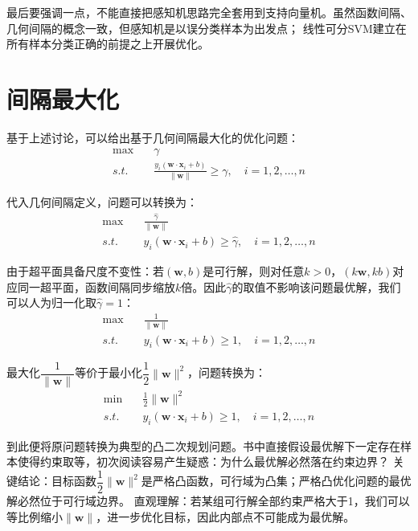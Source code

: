 \documentclass{article}
\begin{document}
        最后要强调一点，不能直接把感知机思路完全套用到支持向量机。虽然函数间隔、几何间隔的概念一致，但感知机是以误分类样本为出发点；
        线性可分SVM建立在所有样本分类正确的前提之上开展优化。

    \section{间隔最大化}
        基于上述讨论，可以给出基于几何间隔最大化的优化问题：
        \begin{align*}
            \max \quad & \gamma \\
            s.t. \quad & \frac{y_i(\boldsymbol{w}\cdot \boldsymbol{x}_i+b)}{\|\boldsymbol{w}\|}\ge \gamma,\quad i=1,2,\dots,n
        \end{align*}

        代入几何间隔定义，问题可以转换为：
        \begin{align*}
            \max \quad & \frac{\widehat{\gamma}}{\|\boldsymbol{w}\|}  \\
            s.t. \quad & y_i(\boldsymbol{w}\cdot \boldsymbol{x}_i+b)\ge \widehat{\gamma},\quad i=1,2,\dots,n
        \end{align*}

        由于超平面具备尺度不变性：若$(\boldsymbol{w},b)$是可行解，则对任意$k>0$，$(k\boldsymbol{w},kb)$对应同一超平面，函数间隔同步缩放$k$倍。因此$\widehat{\gamma}$的取值不影响该问题最优解，我们可以人为归一化取$\widehat{\gamma}=1$：
        \begin{align*}
            \max \quad & \frac{1}{\|\boldsymbol{w}\|}  \\
            s.t. \quad & y_i(\boldsymbol{w}\cdot \boldsymbol{x}_i+b)\ge 1,\quad i=1,2,\dots,n
        \end{align*}

        最大化$\dfrac{1}{\|\boldsymbol{w}\|}$等价于最小化$\dfrac{1}{2}\|\boldsymbol{w}\|^2$，问题转换为：
        \begin{align*}
            \min \quad & \frac{1}{2}\|\boldsymbol{w}\|^2  \\
            s.t. \quad & y_i(\boldsymbol{w}\cdot \boldsymbol{x}_i+b)\ge 1,\quad i=1,2,\dots,n
        \end{align*}

        到此便将原问题转换为典型的凸二次规划问题。书中直接假设最优解下一定存在样本使得约束取等，初次阅读容易产生疑惑：为什么最优解必然落在约束边界？
        关键结论：目标函数$\dfrac12\|\boldsymbol{w}\|^2$是严格凸函数，可行域为凸集；严格凸优化问题的最优解必然位于可行域边界。
        直观理解：若某组可行解全部约束严格大于1，我们可以等比例缩小$\|\boldsymbol{w}\|$，进一步优化目标，因此内部点不可能成为最优解。
\end{document}
